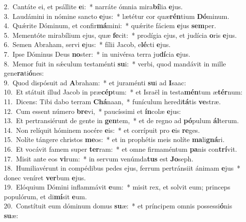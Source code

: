 {2.~}Cantáte ei, et psállite \textbf{e}i:~* narráte ómnia mira\textbf{bí}lia \textbf{e}jus.\\
{3.~}Laudámini in nómine sancto \textbf{e}jus:~* lætétur cor quæ\textbf{rén}tium \textbf{Dó}minum.\\
{4.~}Quǽrite Dóminum, et confir\textbf{má}mini:~* quǽrite fáciem \textbf{e}jus \textbf{sem}per.\\
{5.~}Mementóte mirabílium ejus, quæ \textbf{fe}cit:~* prodígia ejus, et judícia \textbf{o}ris \textbf{e}jus.\\
{6.~}Semen Abraham, servi \textbf{e}jus:~* fílii Jacob, e\textbf{lé}cti \textbf{e}jus.\\
{7.~}Ipse Dóminus Deus \textbf{no}ster:~* in univérsa terra ju\textbf{dí}cia \textbf{e}jus.\\
{8.~}Memor fuit in sǽculum testaménti \textbf{su}i:~* verbi, quod mandávit in mille gene\textbf{ra}ti\textbf{ó}nes:\\
{9.~}Quod dispósuit ad \textbf{A}braham:~* et juraménti \textbf{su}i ad \textbf{I}saac:\\
{10.~}Et státuit illud Jacob in præ\textbf{cép}tum:~* et Israël in testa\textbf{mén}tum æ\textbf{tér}num:\\
{11.~}Dicens: Tibi dabo terram \textbf{Chá}naan,~* funículum heredi\textbf{tá}tis \textbf{ve}stræ.\\
{12.~}Cum essent número \textbf{bre}vi,~* paucíssimi et \textbf{ín}colæ \textbf{e}jus:\\
{13.~}Et pertransiérunt de gente in \textbf{gen}tem,~* et de regno ad \textbf{pó}pulum \textbf{ál}terum.\\
{14.~}Non relíquit hóminem nocére \textbf{e}is:~* et corrípuit pro \textbf{e}is \textbf{re}ges.\\
{15.~}Nolíte tángere christos \textbf{me}os:~* et in prophétis meis nolíte \textbf{ma}li\textbf{gná}ri.\\
{16.~}Et vocávit famem super \textbf{ter}ram:~* et omne firmaméntum \textbf{pa}nis con\textbf{trí}vit.\\
{17.~}Misit ante eos \textbf{vi}rum:~* in servum venúmda\textbf{tus} est \textbf{Jo}seph.\\
{18.~}Humiliavérunt in compédibus pedes ejus, ferrum pertránsiit ánimam \textbf{e}jus~* donec veníret \textbf{ver}bum \textbf{e}jus.\\
{19.~}Elóquium Dómini inflammávit \textbf{e}um:~* misit rex, et solvit eum; princeps populórum, et di\textbf{mí}sit \textbf{e}um.\\
{20.~}Constítuit eum dóminum domus \textbf{su}æ:~* et príncipem omnis possessi\textbf{ó}nis \textbf{su}æ:\\
